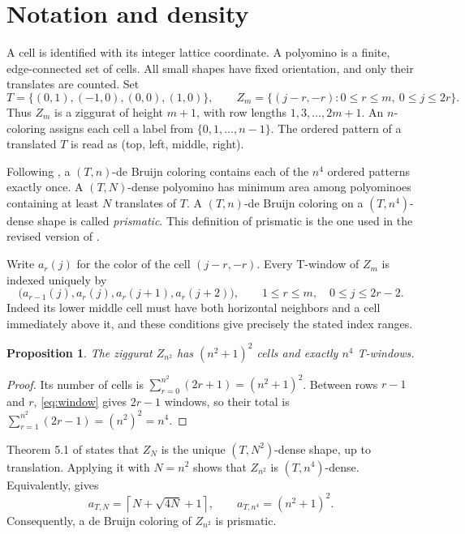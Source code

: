 \documentclass[11pt]{article}
\newtheorem{proposition}{Proposition}
\begin{document}
\section{Notation and density}
A cell is identified with its integer lattice coordinate. A polyomino
is a finite, edge-connected set of cells. All small shapes have fixed
orientation, and only their translates are counted. Set
\[
 T=\{(0,1),(-1,0),(0,0),(1,0)\},\qquad
 Z_m=\{(j-r,-r):0\le r\le m,\ 0\le j\le2r\}.
\]
Thus $Z_m$ is a ziggurat of height $m+1$, with row lengths
$1,3,\ldots,2m+1$. An $n$-coloring assigns each cell a label from
$\{0,1,\ldots,n-1\}$. The ordered pattern of a translated $T$ is read
as (top, left, middle, right).

Following \cite[v2]{CWY}, a $(T,n)$-de Bruijn coloring contains each of
the $n^4$ ordered patterns exactly once. A $(T,N)$-dense polyomino has
minimum area among polyominoes containing at least $N$ translates of $T$.
A $(T,n)$-de Bruijn coloring on a $(T,n^4)$-dense shape is called
\emph{prismatic}. This definition of prismatic is the one used in the
revised version of \cite{CWY}.

Write $a_r(j)$ for the color of the cell $(j-r,-r)$. Every T-window of
$Z_m$ is indexed uniquely by
\begin{equation}\label{eq:window}
 \bigl(a_{r-1}(j),a_r(j),a_r(j+1),a_r(j+2)\bigr),\qquad
 1\le r\le m,\quad0\le j\le2r-2.
\end{equation}
Indeed its lower middle cell must have both horizontal neighbors and
a cell immediately above it, and these conditions give precisely the
stated index ranges.

\begin{proposition}\label{prop:geometry}
The ziggurat $Z_{n^2}$ has $(n^2+1)^2$ cells and exactly $n^4$ T-windows.
\end{proposition}
\begin{proof}
Its number of cells is
$\sum_{r=0}^{n^2}(2r+1)=(n^2+1)^2$. Between rows $r-1$ and $r$,
\eqref{eq:window} gives $2r-1$ windows, so their total is
$\sum_{r=1}^{n^2}(2r-1)=(n^2)^2=n^4$.
\end{proof}

Theorem 5.1 of \cite[v2]{CWY} states that $Z_N$ is the unique
$(T,N^2)$-dense shape, up to translation. Applying it with $N=n^2$
shows that $Z_{n^2}$ is $(T,n^4)$-dense. Equivalently,
\cite[Table 1]{CDGW} gives
\[
 a_{T,N}=\left\lceil N+\sqrt{4N}+1\right\rceil,
 \qquad a_{T,n^4}=(n^2+1)^2.
\]
Consequently, a de Bruijn coloring of $Z_{n^2}$ is prismatic.
\end{document}

